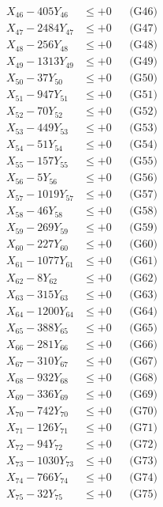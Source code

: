\documentclass[a4paper,10pt]{article}
\begin{document}
{\begin{align}
X_{46} - 405Y_{46} &\leq +0 && \text{(G46)} \\
X_{47} - 2484Y_{47} &\leq +0 && \text{(G47)} \\
X_{48} - 256Y_{48} &\leq +0 && \text{(G48)} \\
X_{49} - 1313Y_{49} &\leq +0 && \text{(G49)} \\
X_{50} - 37Y_{50} &\leq +0 && \text{(G50)} \\
\allowbreak
X_{51} - 947Y_{51} &\leq +0 && \text{(G51)} \\
X_{52} - 70Y_{52} &\leq +0 && \text{(G52)} \\
X_{53} - 449Y_{53} &\leq +0 && \text{(G53)} \\
X_{54} - 51Y_{54} &\leq +0 && \text{(G54)} \\
X_{55} - 157Y_{55} &\leq +0 && \text{(G55)} \\
X_{56} - 5Y_{56} &\leq +0 && \text{(G56)} \\
X_{57} - 1019Y_{57} &\leq +0 && \text{(G57)} \\
X_{58} - 46Y_{58} &\leq +0 && \text{(G58)} \\
X_{59} - 269Y_{59} &\leq +0 && \text{(G59)} \\
X_{60} - 227Y_{60} &\leq +0 && \text{(G60)} \\
\allowbreak
X_{61} - 1077Y_{61} &\leq +0 && \text{(G61)} \\
X_{62} - 8Y_{62} &\leq +0 && \text{(G62)} \\
X_{63} - 315Y_{63} &\leq +0 && \text{(G63)} \\
X_{64} - 1200Y_{64} &\leq +0 && \text{(G64)} \\
X_{65} - 388Y_{65} &\leq +0 && \text{(G65)} \\
X_{66} - 281Y_{66} &\leq +0 && \text{(G66)} \\
X_{67} - 310Y_{67} &\leq +0 && \text{(G67)} \\
X_{68} - 932Y_{68} &\leq +0 && \text{(G68)} \\
X_{69} - 336Y_{69} &\leq +0 && \text{(G69)} \\
X_{70} - 742Y_{70} &\leq +0 && \text{(G70)} \\
\allowbreak
X_{71} - 126Y_{71} &\leq +0 && \text{(G71)} \\
X_{72} - 94Y_{72} &\leq +0 && \text{(G72)} \\
X_{73} - 1030Y_{73} &\leq +0 && \text{(G73)} \\
X_{74} - 766Y_{74} &\leq +0 && \text{(G74)} \\
X_{75} - 32Y_{75} &\leq +0 && \text{(G75)} \\

\end{align}}
\end{document}
